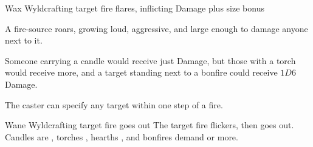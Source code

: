   {\mFire}%
  {Wax}%
  {}%
  {Wyldcrafting}%
  {target fire flares, inflicting  Damage plus size bonus}%
  {
    A fire-source roars, growing loud, aggressive, and large enough to damage anyone next to it.

    Someone carrying a candle would receive just  Damage, but those with a torch would receive more, and a target standing next to a bonfire could receive $1D6$ Damage.

    The caster can specify any target within one step of a fire.
  }

  {\mFire}%
  {Wane}%
  {}%
  {Wyldcrafting}%
  {target fire goes out}%
  {
    The target fire flickers, then goes out.
    Candles are , torches , hearths , and bonfires demand  or more.
  }

